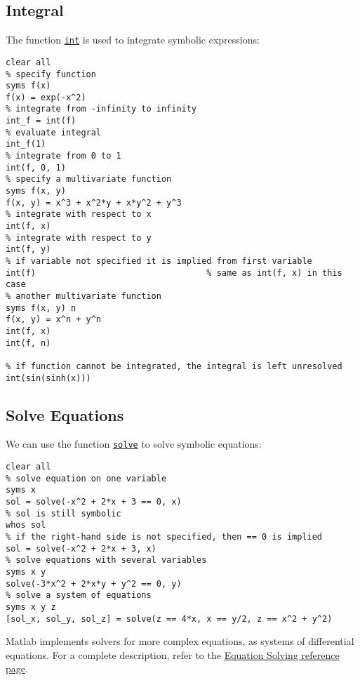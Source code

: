 \documentclass[12pt, a4paper]{article}
\begin{document}
\subsection{Integral}
\label{sec:org35e8081}
The function \href{https://www.mathworks.com/help/symbolic/performing-symbolic-computations.html}{\texttt{int}} is used to integrate symbolic expressions:
\lstset{language=matlab,label= ,caption= ,captionpos=b,firstnumber=1,numbers=left,style=Matlab-editor}
\begin{lstlisting}
clear all
% specify function
syms f(x)
f(x) = exp(-x^2)
% integrate from -infinity to infinity
int_f = int(f)
% evaluate integral
int_f(1)
% integrate from 0 to 1
int(f, 0, 1)
% specify a multivariate function
syms f(x, y)
f(x, y) = x^3 + x^2*y + x*y^2 + y^3
% integrate with respect to x
int(f, x)
% integrate with respect to y
int(f, y)
% if variable not specified it is implied from first variable
int(f)                                  % same as int(f, x) in this case
% another multivariate function
syms f(x, y) n
f(x, y) = x^n + y^n
int(f, x)
int(f, n)

% if function cannot be integrated, the integral is left unresolved
int(sin(sinh(x)))
\end{lstlisting}
\subsection{Solve Equations}
\label{sec:org34a8df7}
We can use the function \href{https://www.mathworks.com/help/symbolic/solve.html}{\texttt{solve}} to solve symbolic equations:
\lstset{language=matlab,label= ,caption= ,captionpos=b,firstnumber=1,numbers=left,style=Matlab-editor}
\begin{lstlisting}
clear all
% solve equation on one variable
syms x
sol = solve(-x^2 + 2*x + 3 == 0, x)
% sol is still symbolic
whos sol
% if the right-hand side is not specified, then == 0 is implied
sol = solve(-x^2 + 2*x + 3, x)
% solve equations with several variables
syms x y
solve(-3*x^2 + 2*x*y + y^2 == 0, y)
% solve a system of equations
syms x y z
[sol_x, sol_y, sol_z] = solve(z == 4*x, x == y/2, z == x^2 + y^2)
\end{lstlisting}
Matlab implements solvers for more complex equations, as systems of differential equations.
For a complete description, refer to the \href{https://www.mathworks.com/help/symbolic/equation-solving.html}{Equation Solving reference page}.
\end{document}
